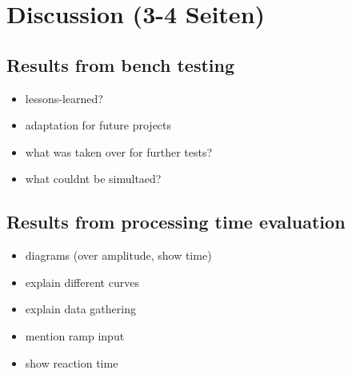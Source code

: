 \documentclass[ExampleMasters.tex]{subfiles}
\begin{document}
\clearpage
{\pagestyle{empty}\cleardoublepage}%
\chapter{Discussion (3-4 Seiten)}
\label{chap:discussion}

\section{Results from bench testing}
\label{sec:results_bench}

\begin{itemize}
	\item lessons-learned?
	\item adaptation for future projects
	\item what was taken over for further tests? 
	\item what couldnt be simultaed?
\end{itemize}

\section{Results from processing time evaluation}
\label{sec:results_processing_time}

\begin{itemize}
	\item diagrams (over amplitude, show time)
	\item explain different curves
	\item explain data gathering
	\item mention ramp input 
	\item show reaction time
\end{itemize}
\end{document}
